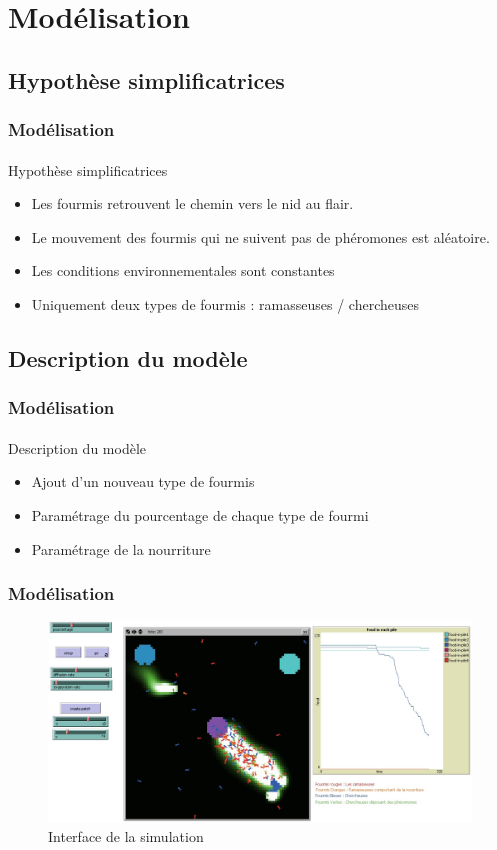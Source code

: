 \documentclass{beamer}
\begin{document}
\section{Modélisation}
\subsection{Hypothèse simplificatrices}
\begin{frame}
\frametitle{Modélisation}
\framesubtitle{}
\begin{block}{Hypothèse simplificatrices}
\begin{itemize}
\item Les fourmis retrouvent le chemin vers le nid au flair.
\item Le mouvement des fourmis qui ne suivent pas de phéromones
est aléatoire.
\item Les conditions environnementales sont constantes
\item Uniquement deux types de fourmis : ramasseuses / chercheuses
\end{itemize}
\end{block}
\end{frame}

\subsection{Description du modèle}
\begin{frame}
\frametitle{Modélisation}
\framesubtitle{}
\begin{block}{Description du modèle}
\begin{itemize}
\item Ajout d'un nouveau type de fourmis
\item Paramétrage du pourcentage de chaque type de fourmi
\item Paramétrage de la nourriture
\end{itemize}
\end{block}
\end{frame}


\begin{frame}
\frametitle{Modélisation}
\begin{figure}
\includegraphics[scale=0.3]{Modelisation.jpg}
\caption{Interface de la simulation}
\end{figure}
\end{frame}
\end{document}
